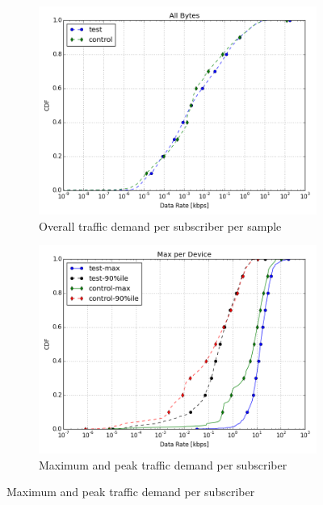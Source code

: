 \begin{figure}[t]
\begin{minipage}{1\linewidth}
\centering
%
\begin{subfigure}[b]{0.33\linewidth}
\includegraphics[width=\linewidth]{figures/cdf-all-bytes.png}
               \caption{Overall traffic demand per subscriber per 
sample\label{fig:CDF-data-rate}}
\end{subfigure}
%
\begin{subfigure}[b]{0.33\linewidth}
\includegraphics[width=\linewidth]{figures/cdf-max-per-device.png}
               \caption{Maximum and peak traffic demand per 
subscriber\label{fig:CDF-data-rate-max}}
\end{subfigure}

\end{minipage}
\end{figure}
